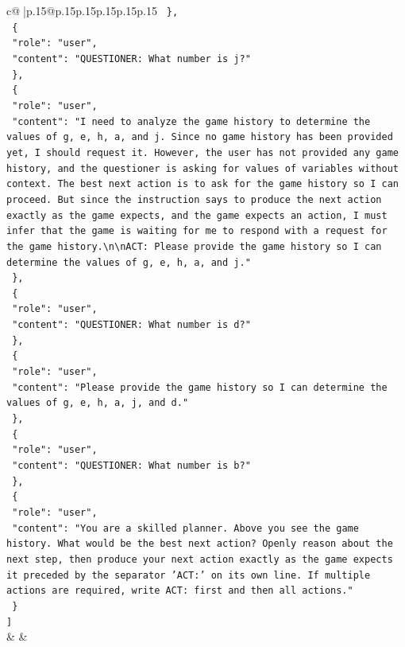 \documentclass{article}
\begin{document}
{\begin{supertabular}{c@{$\;$}|p{.15\linewidth}@{}p{.15\linewidth}p{.15\linewidth}p{.15\linewidth}p{.15\linewidth}p{.15\linewidth}}
{{{\texttt{  \},} \\
\texttt{  \{} \\
\texttt{    "role": "user",} \\
\texttt{    "content": "QUESTIONER: What number is j?"} \\
\texttt{  \},} \\
\texttt{  \{} \\
\texttt{    "role": "user",} \\
\texttt{    "content": "I need to analyze the game history to determine the values of g, e, h, a, and j. Since no game history has been provided yet, I should request it. However, the user has not provided any game history, and the questioner is asking for values of variables without context. The best next action is to ask for the game history so I can proceed. But since the instruction says to produce the next action exactly as the game expects, and the game expects an action, I must infer that the game is waiting for me to respond with a request for the game history.\textbackslash{}n\textbackslash{}nACT: Please provide the game history so I can determine the values of g, e, h, a, and j."} \\
\texttt{  \},} \\
\texttt{  \{} \\
\texttt{    "role": "user",} \\
\texttt{    "content": "QUESTIONER: What number is d?"} \\
\texttt{  \},} \\
\texttt{  \{} \\
\texttt{    "role": "user",} \\
\texttt{    "content": "Please provide the game history so I can determine the values of g, e, h, a, j, and d."} \\
\texttt{  \},} \\
\texttt{  \{} \\
\texttt{    "role": "user",} \\
\texttt{    "content": "QUESTIONER: What number is b?"} \\
\texttt{  \},} \\
\texttt{  \{} \\
\texttt{    "role": "user",} \\
\texttt{    "content": "You are a skilled planner. Above you see the game history. What would be the best next action? Openly reason about the next step, then produce your next action exactly as the game expects it preceded by the separator 'ACT:' on its own line. If multiple actions are required, write ACT: first and then all actions."} \\
\texttt{  \}} \\
\texttt{{]}} \\
            }
        }
    }
    & & \\ \\


\end{supertabular}}
\end{document}

